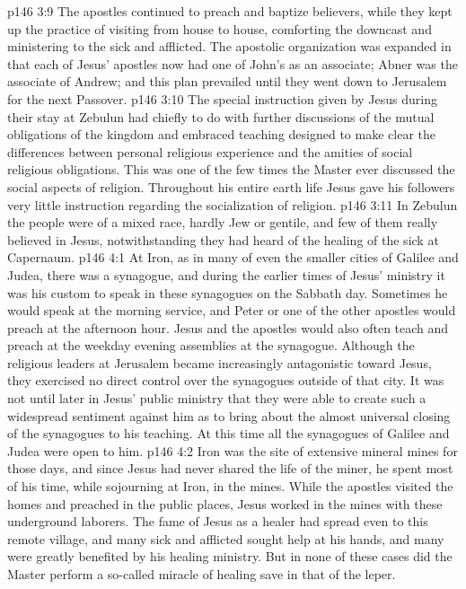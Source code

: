 \vs p146 3:9 \pc The apostles continued to preach and baptize believers, while they kept up the practice of visiting from house to house, comforting the downcast and ministering to the sick and afflicted. The apostolic organization was expanded in that each of Jesus’ apostles now had one of John’s as an associate; Abner was the associate of Andrew; and this plan prevailed until they went down to Jerusalem for the next Passover.
\vs p146 3:10 \pc The special instruction given by Jesus during their stay at Zebulun had chiefly to do with further discussions of the mutual obligations of the kingdom and embraced teaching designed to make clear the differences between personal religious experience and the amities of social religious obligations. This was one of the few times the Master ever discussed the social aspects of religion. Throughout his entire earth life Jesus gave his followers very little instruction regarding the socialization of religion.
\vs p146 3:11 In Zebulun the people were of a mixed race, hardly Jew or gentile, and few of them really believed in Jesus, notwithstanding they had heard of the healing of the sick at Capernaum.
\vs p146 4:1 At Iron, as in many of even the smaller cities of Galilee and Judea, there was a synagogue, and during the earlier times of Jesus’ ministry it was his custom to speak in these synagogues on the Sabbath day. Sometimes he would speak at the morning service, and Peter or one of the other apostles would preach at the afternoon hour. Jesus and the apostles would also often teach and preach at the weekday evening assemblies at the synagogue. Although the religious leaders at Jerusalem became increasingly antagonistic toward Jesus, they exercised no direct control over the synagogues outside of that city. It was not until later in Jesus’ public ministry that they were able to create such a widespread sentiment against him as to bring about the almost universal closing of the synagogues to his teaching. At this time all the synagogues of Galilee and Judea were open to him.
\vs p146 4:2 Iron was the site of extensive mineral mines for those days, and since Jesus had never shared the life of the miner, he spent most of his time, while sojourning at Iron, in the mines. While the apostles visited the homes and preached in the public places, Jesus worked in the mines with these underground laborers. The fame of Jesus as a healer had spread even to this remote village, and many sick and afflicted sought help at his hands, and many were greatly benefited by his healing ministry. But in none of these cases did the Master perform a so\hyp{}called miracle of healing save in that of the leper.
